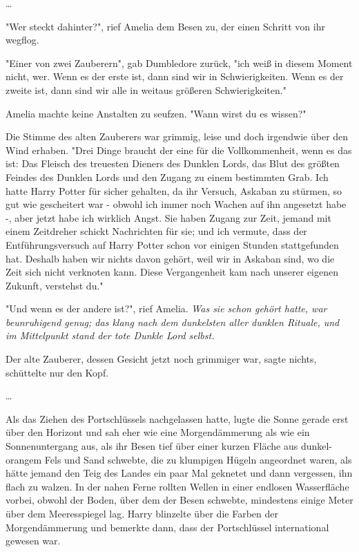 {…

"Wer steckt dahinter?", rief Amelia dem Besen zu, der einen Schritt von ihr wegflog.

"Einer von zwei Zauberern", gab Dumbledore zurück, "ich weiß in diesem Moment nicht, wer. Wenn es der erste ist, dann sind wir in Schwierigkeiten. Wenn es der zweite ist, dann sind wir alle in weitaus größeren Schwierigkeiten."

Amelia machte keine Anstalten zu seufzen. "Wann wirst du es wissen?"

Die Stimme des alten Zauberers war grimmig, leise und doch irgendwie über den Wind erhaben. "Drei Dinge braucht der eine für die Vollkommenheit, wenn es das ist: Das Fleisch des treuesten Dieners des Dunklen Lords, das Blut des größten Feindes des Dunklen Lords und den Zugang zu einem bestimmten Grab. Ich hatte Harry Potter für sicher gehalten, da ihr Versuch, Askaban zu stürmen, so gut wie gescheitert war - obwohl ich immer noch Wachen auf ihn angesetzt habe -, aber jetzt habe ich wirklich Angst. Sie haben Zugang zur Zeit, jemand mit einem Zeitdreher schickt Nachrichten für sie; und ich vermute, dass der Entführungsversuch auf Harry Potter schon vor einigen Stunden stattgefunden hat. Deshalb haben wir nichts davon gehört, weil wir in Askaban sind, wo die Zeit sich nicht verknoten kann. Diese Vergangenheit kam nach unserer eigenen Zukunft, verstehst du."

"Und wenn es der andere ist?", rief Amelia. \emph{Was sie schon gehört hatte, war beunruhigend genug; das klang nach dem dunkelsten aller dunklen Rituale, und im Mittelpunkt stand der tote Dunkle Lord selbst.}

Der alte Zauberer, dessen Gesicht jetzt noch grimmiger war, sagte nichts, schüttelte nur den Kopf.

…

Als das Ziehen des Portschlüssels nachgelassen hatte, lugte die Sonne gerade erst über den Horizont und sah eher wie eine Morgendämmerung als wie ein Sonnenuntergang aus, als ihr Besen tief über einer kurzen Fläche aus dunkel-orangem Fels und Sand schwebte, die zu klumpigen Hügeln angeordnet waren, als hätte jemand den Teig des Landes ein paar Mal geknetet und dann vergessen, ihn flach zu walzen. In der nahen Ferne rollten Wellen in einer endlosen Wasserfläche vorbei, obwohl der Boden, über dem der Besen schwebte, mindestens einige Meter über dem Meeresspiegel lag. Harry blinzelte über die Farben der Morgendämmerung und bemerkte dann, dass der Portschlüssel international gewesen war.

}
